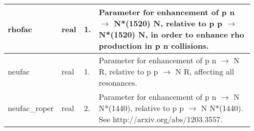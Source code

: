 \documentclass{article}
\begin{document}
\begin{longtable}{llll}
\midrule
rhofac & \begin{minipage}[t]{2cm}real\end{minipage} & \begin{minipage}[t]{2cm}1.\end{minipage} & \begin{minipage}[t]{12cm}Parameter for enhancement of p n $\rightarrow$ N*(1520) N, relative to  p p $\rightarrow$ N*(1520) N, in order to enhance rho production in p n collisions.\end{minipage}\\*
\midrule
neufac & \begin{minipage}[t]{2cm}real\end{minipage} & \begin{minipage}[t]{2cm}1.\end{minipage} & \begin{minipage}[t]{12cm}Parameter for enhancement of p n $\rightarrow$ N R, relative to  p p $\rightarrow$ N R, affecting all resonances.\end{minipage}\\*
\midrule
neufac\_roper & \begin{minipage}[t]{2cm}real\end{minipage} & \begin{minipage}[t]{2cm}2.\end{minipage} & \begin{minipage}[t]{12cm}Parameter for enhancement of p n $\rightarrow$ N N*(1440), relative to p p $\rightarrow$ N N*(1440). See http://arxiv.org/abs/1203.3557.\end{minipage}\\*
\bottomrule
\end{longtable}
{ }



\end{document}
